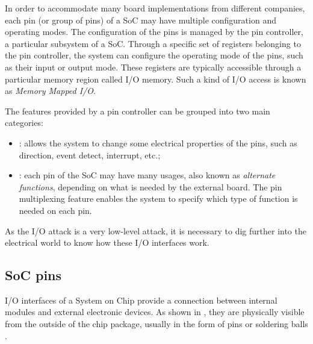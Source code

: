 In order to accommodate many board implementations from different companies, each pin (or group of pins) of a SoC may have multiple configuration and operating modes.
The configuration of the pins is managed by the pin controller, a particular subsystem of a SoC.
Through a specific set of registers belonging to the pin controller, the system can configure the operating mode of the pins, such as their input or output mode.
These registers are typically accessible through a particular memory region called I/O memory. Such a kind of I/O access is known as \emph{Memory Mapped I/O}.

The features provided by a pin controller can be grouped into two main categories:
\begin{itemize}
	\item {}: allows the system to change some electrical properties of the pins, such as direction, event detect, interrupt, etc.;
	\item {}: each pin of the SoC may have many usages, also known as \emph{alternate functions}, depending on what is needed by the external board.
		The pin multiplexing feature enables the system to specify which type of function is needed on each pin.
\end{itemize}

As the I/O attack is a very low-level attack, it is necessary to dig further into the electrical world to know how these I/O interfaces work.


\subsection{SoC pins}
\label{sec:iopins}

I/O interfaces of a System on Chip provide a connection between internal modules and external electronic devices.
As shown in , they are physically visible from the outside of the chip package,
usually in the form of pins  or soldering balls .

